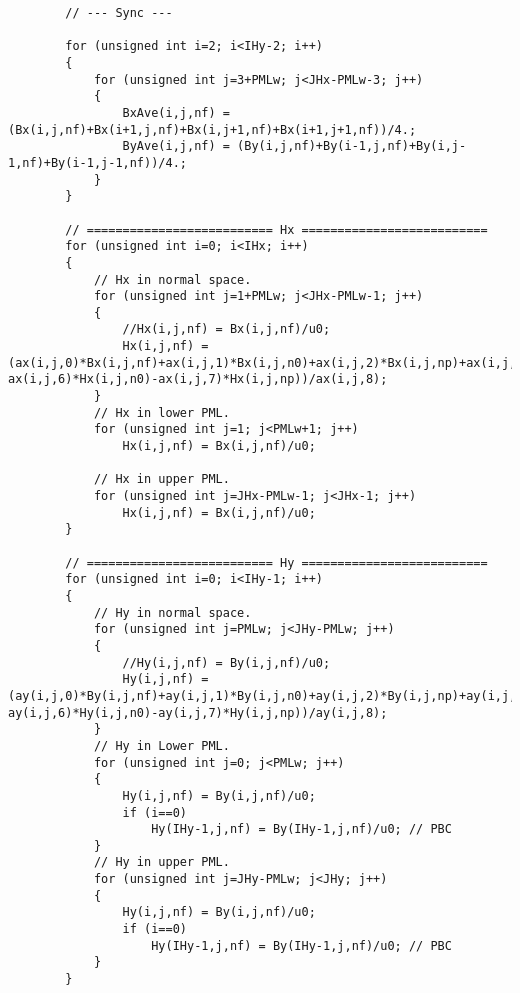\begin{lstlisting}
		// --- Sync ---

		for (unsigned int i=2; i<IHy-2; i++)
		{
			for (unsigned int j=3+PMLw; j<JHx-PMLw-3; j++)
			{
				BxAve(i,j,nf) = (Bx(i,j,nf)+Bx(i+1,j,nf)+Bx(i,j+1,nf)+Bx(i+1,j+1,nf))/4.;
				ByAve(i,j,nf) = (By(i,j,nf)+By(i-1,j,nf)+By(i,j-1,nf)+By(i-1,j-1,nf))/4.;
			}
		}

		// ========================== Hx ==========================
		for (unsigned int i=0; i<IHx; i++)
		{
			// Hx in normal space.
			for (unsigned int j=1+PMLw; j<JHx-PMLw-1; j++)
			{
				//Hx(i,j,nf) = Bx(i,j,nf)/u0;
				Hx(i,j,nf) = (ax(i,j,0)*Bx(i,j,nf)+ax(i,j,1)*Bx(i,j,n0)+ax(i,j,2)*Bx(i,j,np)+ax(i,j,3)*ByAve(i,j,nf)+ax(i,j,4)*ByAve(i,j,n0)+ax(i,j,5)*ByAve(i,j,np)-ax(i,j,6)*Hx(i,j,n0)-ax(i,j,7)*Hx(i,j,np))/ax(i,j,8);
			}
			// Hx in lower PML.
			for (unsigned int j=1; j<PMLw+1; j++)
				Hx(i,j,nf) = Bx(i,j,nf)/u0;

			// Hx in upper PML.
			for (unsigned int j=JHx-PMLw-1; j<JHx-1; j++)
				Hx(i,j,nf) = Bx(i,j,nf)/u0;
		}

		// ========================== Hy ==========================
		for (unsigned int i=0; i<IHy-1; i++)
		{
			// Hy in normal space.
			for (unsigned int j=PMLw; j<JHy-PMLw; j++)
			{
				//Hy(i,j,nf) = By(i,j,nf)/u0;
				Hy(i,j,nf) = (ay(i,j,0)*By(i,j,nf)+ay(i,j,1)*By(i,j,n0)+ay(i,j,2)*By(i,j,np)+ay(i,j,3)*BxAve(i,j,nf)+ay(i,j,4)*BxAve(i,j,n0)+ay(i,j,5)*BxAve(i,j,np)-ay(i,j,6)*Hy(i,j,n0)-ay(i,j,7)*Hy(i,j,np))/ay(i,j,8);
			}
			// Hy in Lower PML.
			for (unsigned int j=0; j<PMLw; j++)
			{
				Hy(i,j,nf) = By(i,j,nf)/u0;
				if (i==0)
					Hy(IHy-1,j,nf) = By(IHy-1,j,nf)/u0; // PBC
			}
			// Hy in upper PML.
			for (unsigned int j=JHy-PMLw; j<JHy; j++)
			{
				Hy(i,j,nf) = By(i,j,nf)/u0;
				if (i==0)
					Hy(IHy-1,j,nf) = By(IHy-1,j,nf)/u0; // PBC
			}
		}


\end{lstlisting}
